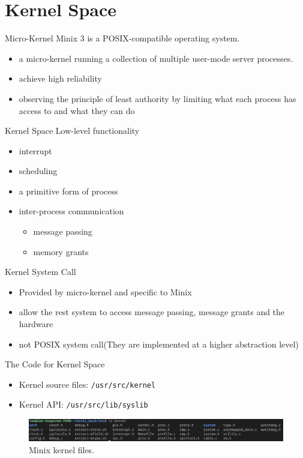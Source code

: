 \documentclass[12pt]{beamer}
\begin{document}
\section{Kernel Space}
\begin{frame}{Micro-Kernel}
Minix 3 is a POSIX-compatible operating system.
\begin{itemize}
    \item a micro-kernel running a collection of multiple user-mode server processes.
    \item achieve high reliability
    \item observing the principle of least authority by limiting what each process has access to and what they can do
\end{itemize}
\end{frame}
\begin{frame}{Kernel Space}
    Low-level functionality
    \begin{itemize}
        \item interrupt
        \item scheduling
        \item a primitive form of process
        \item inter-process communication
        \begin{itemize}
            \item message passing
            \item memory grants
        \end{itemize}
    \end{itemize}
\end{frame}

\begin{frame}{Kernel System Call}
\begin{itemize}

    \item Provided by micro-kernel and specific to Minix
    \item allow the rest system to access message passing, message grants and the hardware
    \item not POSIX system call(They are implemented at a higher abstraction level)
         
\end{itemize}
\end{frame}
\begin{frame}[fragile]{The Code for Kernel Space}

\begin{itemize}
    \item Kernel source files: \texttt{/usr/src/kernel}

    \item Kernel API: \texttt{/usr/src/lib/syslib}
    
\end{itemize}
        \begin{figure}[!htb]
	\centering
	\includegraphics[scale=0.12]{kernel.png}
	\caption{Minix kernel files.}
	\label{fig:png_a}
\end{figure}
\end{frame}
\end{document}
